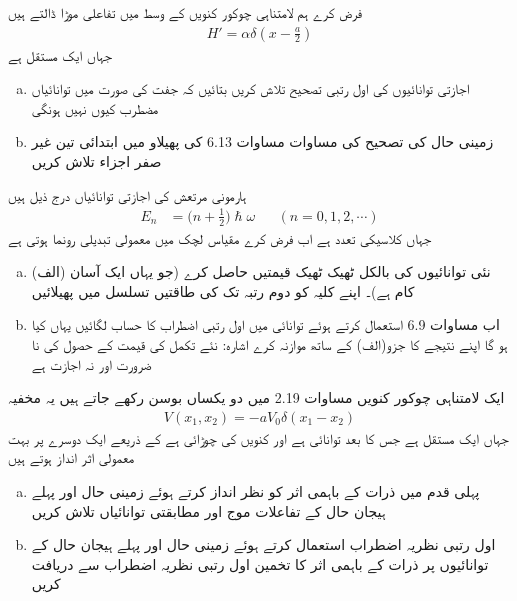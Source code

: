 فرض کرے ہم لامتناہی چوکور کنویں کے وسط میں  تفاعلی موڑا ڈالتے ہیں 
\begin{align*}
H' = \alpha \delta (x - \frac{a}{2})
\end{align*}
جہاں  ایک مستقل ہے 
\begin{enumerate}[a.]
\item
 اجازتی توانائیوں کی اول رتبی تصحیح تلاش کریں بتائیں کہ جفت  کی صورت میں توانائیاں مضطرب کیوں نہیں ہونگی   
\item
 زمینی حال کی  تصحیح  کی مساوات مساوات 6.13 کی پھیلاو  میں ابتدائی تین غیر صفر اجزاء تلاش کریں  
 \end{enumerate}

ہارمونی مرتعش  
کی اجازتی توانائیاں درج ذیل ہیں 
\begin{align*}
E_n &= \big(n + \frac{1}{2}\big) \hslash \omega  && (n = 0, 1, 2, \cdots )
\end{align*}
جہاں  کلاسیکی تعدد ہے اب فرض کرے مقیاس لچک میں معمولی تبدیلی رونما ہوتی ہے 
\begin{enumerate}[a.]
\item
(الف) نئی  توانائیوں کی بالکل ٹھیک ٹھیک قیمتیں  حاصل  کرے (جو یہاں ایک آسان کام ہے)۔ اپنے  کلیہ کو دوم رتبہ تک  کی طاقتیں تسلسل میں پھیلائیں 
\item
 اب مساوات 6.9 استعمال کرتے ہوئے توانائی میں اول رتبی اضطراب کا حساب لگائیں یہاں  کیا  ہو گا اپنے نتیجے کا جزو(الف) کے ساتھ موازنہ کرے اشارہ: نئے تکمل کی قیمت کے حصول کی نا ضرورت اور نہ اجازت ہے 
 \end{enumerate}
ایک لامتناہی چوکور کنویں مساوات 2.19 میں دو یکساں بوسن رکھے جاتے ہیں یہ مخفیہ 
\begin{align*}
V(x_1, x_2) = -aV_0\delta (x_1 - x_2)
\end{align*}
 جہاں  ایک مستقل ہے جس کا بعد توانائی ہے  اور  کنویں کی چوڑائی ہے کے ذریعے ایک دوسرے پر بہت معمولی اثر انداز ہوتے ہیں 
\begin{enumerate}[a.]
\item
 پہلی قدم میں ذرات کے باہمی   اثر  کو نظر انداز کرتے ہوئے زمینی حال اور پہلے ہیجان حال کے تفاعلات موج اور مطابقتی توانائیاں تلاش کریں 
\item
 اول رتبی نظریہ اضطراب استعمال کرتے ہوئے زمینی حال اور پہلے    ہیجان  حال کے توانائیوں پر ذرات کے باہمی  اثر کا تخمین اول رتبی نظریہ اضطراب سے دریافت کریں 
 \end{enumerate}

